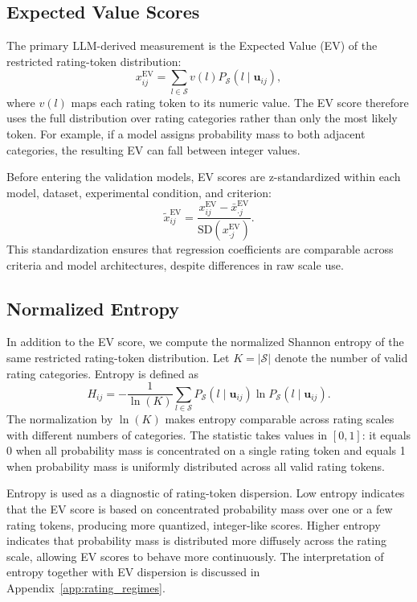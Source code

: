 \subsection{Expected Value Scores}

The primary LLM-derived measurement is the Expected Value (EV) of the restricted rating-token distribution:
\begin{equation}\label{eq:app_weighted_score}
x_{ij}^{\mathrm{EV}}
=
\sum_{l \in \mathcal{S}} v(l) P_{\mathcal{S}}(l \mid \mathbf{u}_{ij}),
\end{equation}
where $v(l)$ maps each rating token to its numeric value. The EV score therefore uses the full distribution over rating categories rather than only the most likely token. For example, if a model assigns probability mass to both adjacent categories, the resulting EV can fall between integer values.

Before entering the validation models, EV scores are z-standardized within each model, dataset, experimental condition, and criterion:
\begin{equation}
\tilde{x}_{ij}^{\mathrm{EV}}
=
\frac{x_{ij}^{\mathrm{EV}} - \bar{x}_{\cdot j}^{\mathrm{EV}}}
{\mathrm{SD}(x_{\cdot j}^{\mathrm{EV}})}.
\end{equation}
This standardization ensures that regression coefficients are comparable across criteria and model architectures, despite differences in raw scale use.

\subsection{Normalized Entropy}

In addition to the EV score, we compute the normalized Shannon entropy of the same restricted rating-token distribution. Let $K = |\mathcal{S}|$ denote the number of valid rating categories. Entropy is defined as
\begin{equation}\label{eq:app_normalized_entropy}
H_{ij}
=
-\frac{1}{\ln(K)}
\sum_{l \in \mathcal{S}}
P_{\mathcal{S}}(l \mid \mathbf{u}_{ij})
\ln P_{\mathcal{S}}(l \mid \mathbf{u}_{ij}).
\end{equation}
The normalization by $\ln(K)$ makes entropy comparable across rating scales with different numbers of categories. The statistic takes values in $[0,1]$: it equals 0 when all probability mass is concentrated on a single rating token and equals 1 when probability mass is uniformly distributed across all valid rating tokens.

Entropy is used as a diagnostic of rating-token dispersion. Low entropy indicates that the EV score is based on concentrated probability mass over one or a few rating tokens, producing more quantized, integer-like scores. Higher entropy indicates that probability mass is distributed more diffusely across the rating scale, allowing EV scores to behave more continuously. The interpretation of entropy together with EV dispersion is discussed in Appendix~\ref{app:rating_regimes}.





